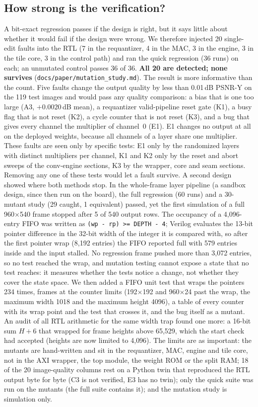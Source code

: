 \documentclass[conference]{IEEEtran}
\begin{document}
\subsection{How strong is the verification?}
A bit-exact regression passes if the design is right, but it says little about whether it would fail if the design were wrong. We therefore injected 20 single-edit faults into the RTL (7 in the requantizer, 4 in the MAC, 3 in the engine, 3 in the tile core, 3 in the control path) and ran the quick regression (36 runs) on each; an unmutated control passes 36 of 36.
\textbf{All 20 are detected; none survives} (\texttt{docs/\allowbreak{}paper/\allowbreak{}mutation\_study.md}). The result is more informative than the count. Five faults change the output quality by less than 0.01\,dB PSNR-Y on the 119 test images and would pass any quality comparison: a bias that is one too large (A3, $+0.0020$\,dB mean), a requantizer valid-pipeline reset gate (K1), a busy flag that is not reset (K2), a cycle counter that is not reset (K3), and a bug that gives every channel the multiplier of channel~0 (E1).
E1 changes no output at all on the deployed weights, because all channels of a layer share one multiplier. These faults are seen only by specific tests: E1 only by the randomized layers with distinct multipliers per channel, K1 and K2 only by the reset and abort sweeps of the conv-engine sections, K3 by the wrapper, core and seam sections. Removing any one of these tests would let a fault survive.
A second design showed where both methods stop. In the whole-frame layer pipeline (a sandbox design, since then run on the board), the full regression (60 runs) and a 30-mutant study (29 caught, 1 equivalent) passed, yet the first simulation of a full 960$\times$540 frame stopped after 5 of 540 output rows. The occupancy of a 4{,}096-entry FIFO was written as \texttt{(wp - rp) >= DEPTH - 4}; Verilog evaluates the 13-bit pointer difference in the 32-bit width of the integer it is compared with, so after the first pointer wrap (8{,}192 entries) the FIFO reported full with 579 entries inside and the input stalled. No regression frame pushed more than 3{,}072 entries, so no test reached the wrap, and mutation testing cannot expose a state that no test reaches: it measures whether the tests notice a change, not whether they cover the state space. We then added a FIFO unit test that wraps the pointers 234 times, frames at the counter limits (192$\times$192 and 960$\times$24 past the wrap, the maximum width 1018 and the maximum height 4096), a table of every counter with its wrap point and the test that crosses it, and the bug itself as a mutant. An audit of all RTL arithmetic for the same width trap found one more: a 16-bit sum $H+6$ that wrapped for frame heights above 65{,}529, which the start check had accepted (heights are now limited to 4{,}096).
The limits are as important: the mutants are hand-written and sit in the requantizer, MAC, engine and tile core, not in the AXI wrapper, the top module, the weight ROM or the split RAM; 18 of the 20 image-quality columns rest on a Python twin that reproduced the RTL output byte for byte (C3 is not verified, E3 has no twin); only the quick suite was run on the mutants (the full suite contains it); and the mutation study is simulation only.
\end{document}
